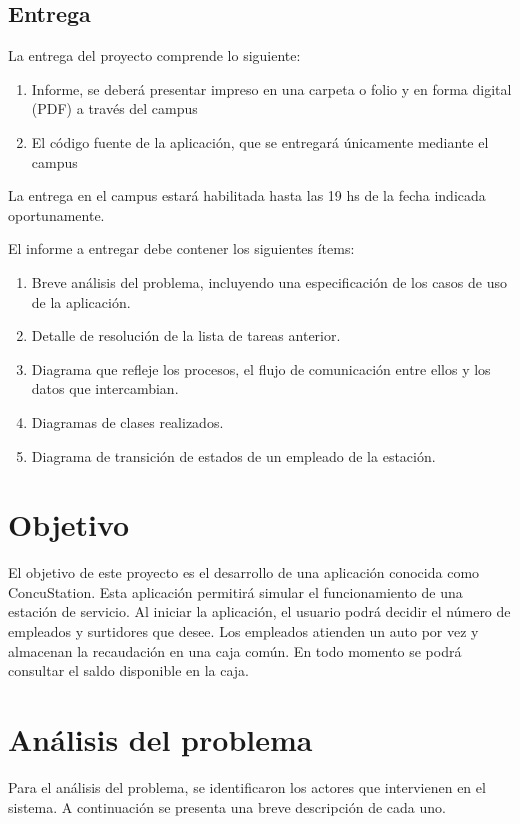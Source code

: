 \documentclass[12pt,a4paper,titlepage,oneside]{article}
\begin{document}
\subsection{Entrega} 

La entrega del proyecto comprende lo siguiente:

\begin{enumerate}
\item
Informe, se deberá presentar impreso en una carpeta o folio y en forma digital (PDF) a través del campus
\item
El código fuente de la aplicación, que se entregará únicamente mediante el campus
\end{enumerate}

La entrega en el campus estará habilitada hasta las 19 hs de la fecha indicada oportunamente.

El informe a entregar debe contener los siguientes ítems:

\begin{enumerate}
\item
Breve análisis del problema, incluyendo una especificación de los casos de uso de la aplicación.
\item
Detalle de resolución de la lista de tareas anterior.
\item
Diagrama que refleje los procesos, el flujo de comunicación entre ellos y los datos que intercambian.
\item
Diagramas de clases realizados.
\item
Diagrama de transición de estados de un empleado de la estación.
\end{enumerate}

\section{Objetivo}
El objetivo de este proyecto es el desarrollo de una aplicación conocida como ConcuStation.
Esta aplicación permitirá simular el funcionamiento de una estación de servicio. Al iniciar la aplicación, el usuario podrá decidir el número de empleados y surtidores que desee.
Los empleados atienden un auto por vez y almacenan la recaudación en una caja común. En todo momento se podrá consultar el saldo disponible en la caja.

\section{Análisis del problema}
Para el análisis del problema, se identificaron los actores que intervienen en el sistema. A continuación se presenta una breve descripción de cada uno.
\end{document}
